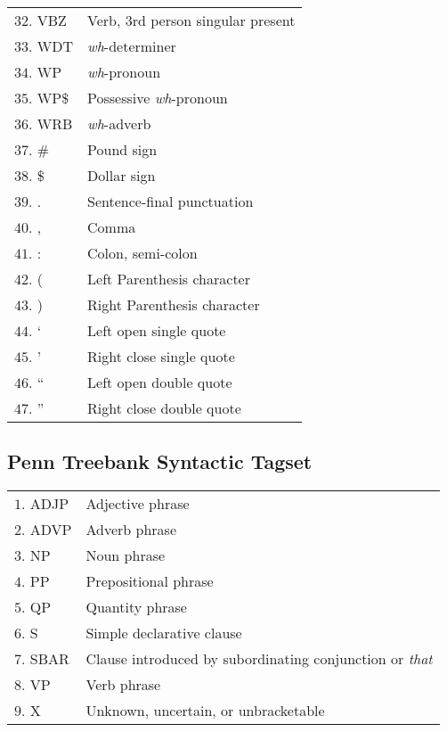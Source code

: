 \begin{tabular}{p{4.5cm}l}
$32$. VBZ &   Verb, 3rd person singular present\\
$33$. WDT &   \textit{wh}-determiner\\
$34$. WP &  \textit{wh}-pronoun\\
$35$. WP\$ &   Possessive \textit{wh}-pronoun\\
$36$. WRB &   \textit{wh}-adverb\\
$37$. \# &   Pound sign\\
$38$. \$ &   Dollar sign\\
$39$. . &   Sentence-final punctuation\\
$40$. , &   Comma\\
$41$. : &   Colon, semi-colon\\
$42$. ( &   Left Parenthesis character\\
$43$. ) &   Right Parenthesis character\\
$44$. ` &   Left open single quote\\
$45$. ' &   Right close single quote\\
$46$. `` &   Left open double quote\\
$47$. '' &   Right close double quote\\
\end{tabular}

\subsection{Penn Treebank Syntactic Tagset}
\begin{tabular}{p{4.5cm}l}
$1$. \hphantom{1}ADJP &  Adjective phrase\\
$2$.  \hphantom{1}ADVP &  Adverb phrase\\
$3$. \hphantom{1}NP &  Noun phrase\\
$4$. \hphantom{1}PP &  Prepositional phrase\\
$5$. \hphantom{1}QP &  Quantity phrase\\
$6$. \hphantom{1}S &  Simple declarative clause\\
$7$. \hphantom{1}SBAR &  Clause introduced by subordinating conjunction or \textit{that}\\
$8$. \hphantom{1}VP &  Verb phrase\\
$9$. \hphantom{1}X &  Unknown, uncertain, or unbracketable\\
\end{tabular}
